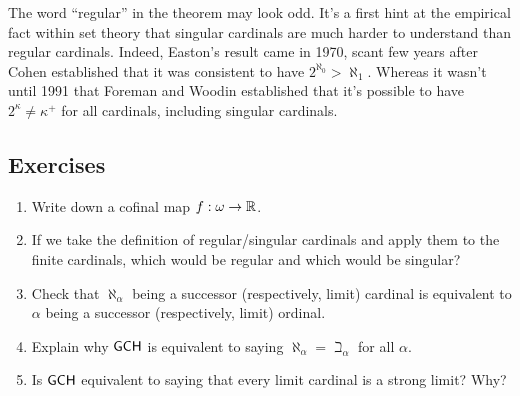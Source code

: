 \documentclass[10pt]{amsart}
\begin{document}
The word ``regular'' in the theorem may look odd. It's a first hint at the empirical fact within set theory that singular cardinals are much harder to understand than regular cardinals. Indeed, Easton's result came in 1970, scant few years after Cohen established that it was consistent to have $2^{\aleph_0} > \aleph_1$. Whereas it wasn't until 1991 that Foreman and Woodin established that it's possible to have $2^\kappa \ne \kappa^+$ for all cardinals, including singular cardinals. 

\subsection*{Exercises}

\begin{enumerate}
\item Write down a cofinal map $f : \omega \to \mathbb{R}$.
\item If we take the definition of regular/singular cardinals and apply them to the finite cardinals, which would be regular and which would be singular?
\item Check that $\aleph_\alpha$ being a successor (respectively, limit) cardinal is equivalent to $\alpha$ being a successor (respectively, limit) ordinal.
\item Explain why $\mathsf{GCH}$ is equivalent to saying $\aleph_\alpha = \beth_\alpha$ for all $\alpha$.
\item Is $\mathsf{GCH}$ equivalent to saying that every limit cardinal is a strong limit? Why?
\end{enumerate}
\end{document}
